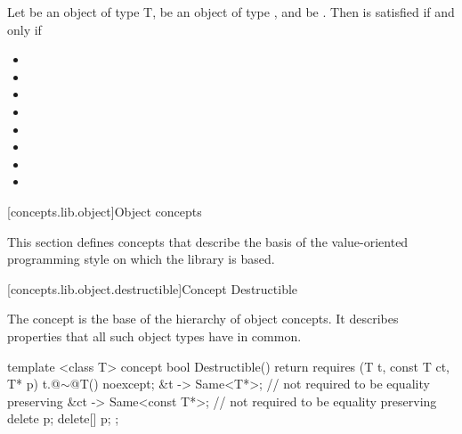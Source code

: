 \begin{addedblock}
\begin{itemdescr}
\pnum
Let  be an object of type T,  be an object
of type , and  be .
Then   is satisfied if and only if

\begin{itemize}
\item {}
\item {}
\item {}
\item {}
\item {}
\item {}
\item {}
\item {}
\end{itemize}
\end{itemdescr}

[concepts.lib.object]{Object concepts}

\pnum
This section defines concepts that describe the basis of the
value-oriented programming style on which the library is based.

[concepts.lib.object.destructible]{Concept Destructible}

\pnum
The  concept is the base of the hierarchy of object concepts.
It describes properties that all such object types have in common.

%
\begin{itemdecl}
template <class T>
concept bool Destructible() {
  return requires (T t, const T ct, T* p) {
    { t.@$\sim$@T() } noexcept;
    { &t } -> Same<T*>; // not required to be equality preserving
    { &ct } -> Same<const T*>; // not required to be equality preserving
    delete p;
    delete[] p;
  };
}
\end{itemdecl}


\end{addedblock}
